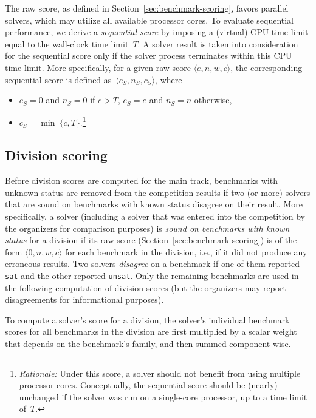 \documentclass[12pt]{article}
\begin{document}
The raw score, as defined in Section~\ref{sec:benchmark-scoring},
favors parallel solvers, which may utilize all available processor
cores.  To evaluate sequential performance, we derive a
\emph{sequential score} by imposing a (virtual) CPU time limit equal
to the wall-clock time limit~$T$.  A solver result is taken into
consideration for the sequential score only if the solver process
terminates within this CPU time limit.  More specifically, for a given
raw score $\langle e, n, w, c\rangle$, the corresponding sequential
score is defined as~$\langle e_S, n_S, c_S\rangle$, where
\begin{itemize}
\item $e_S = 0$ and $n_S = 0$ if $c > T$, $e_S = e$ and $n_S = n$
  otherwise,
\item $c_S = \min\ \{c, T\}$.\footnote{\emph{Rationale:} Under this
  score, a solver should not benefit from using multiple processor
  cores.  Conceptually, the sequential score should be (nearly)
  unchanged if the solver was run on a single-core processor, up to a
  time limit of~$T$.}
\end{itemize}

\subsection{Division scoring}
\label{sec:division-scoring}

%
Before division scores are computed for the main track, benchmarks
with unknown status are removed from the competition results if two
(or more) solvers that are sound on benchmarks with known status
disagree on their result.  More specifically, a solver (including a
solver that was entered into the competition by the organizers for
comparison purposes) is \emph{sound on benchmarks with known status}
for a division if its raw score (Section~\ref{sec:benchmark-scoring})
is of the form $\langle 0, n, w, c\rangle$ for each benchmark in the
division, i.e., if it did not produce any erroneous results.  Two
solvers \emph{disagree} on a benchmark if one of them reported
\texttt{sat} and the other reported \texttt{unsat}.  Only the
remaining benchmarks are used in the following computation of division
scores (but the organizers may report disagreements for informational
purposes).

\medskip

To compute a solver's score for a division, the solver's individual
benchmark scores for all benchmarks in the division are first
multiplied by a scalar weight that depends on the benchmark's family,
and then summed component-wise.
\end{document}
